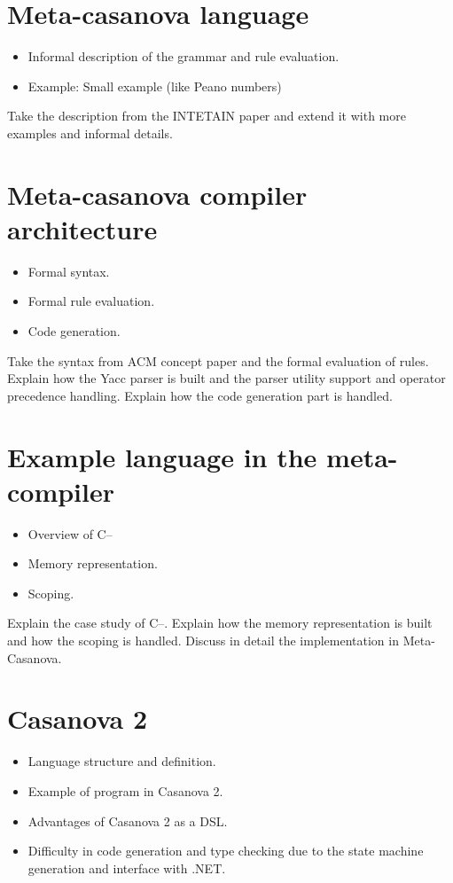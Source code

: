 \documentclass[8pt,a5paper]{extbook}
\begin{document}
\section{Meta-casanova language}
	\begin{itemize}[noitemsep]
		\item Informal description of the grammar and rule evaluation.
		\item Example: Small example (like Peano numbers)
	\end{itemize}
	
Take the description from the INTETAIN paper and extend it with more examples and informal details.

\section{Meta-casanova compiler architecture}
	\begin{itemize}[noitemsep]
		\item Formal syntax.
		\item Formal rule evaluation.
		\item Code generation.
	\end{itemize}
	
Take the syntax from ACM concept paper and the formal evaluation of rules. Explain how the Yacc parser is built and the parser utility support and operator precedence handling. Explain how the code generation part is handled.

\section{Example language in the meta-compiler}
	\begin{itemize}[noitemsep]
		\item Overview of C--
		\item Memory representation.
		\item Scoping.
	\end{itemize}
	
Explain the case study of C--. Explain how the memory representation is built and how the scoping is handled. Discuss in detail the implementation in Meta-Casanova.

\section{Casanova 2}
\begin{itemize}[noitemsep]
	\item Language structure and definition.
	\item Example of program in Casanova 2.
	\item Advantages of Casanova 2 as a DSL.
	\item Difficulty in code generation and type checking due to the state machine generation and interface with .NET.
\end{itemize}
\end{document}
